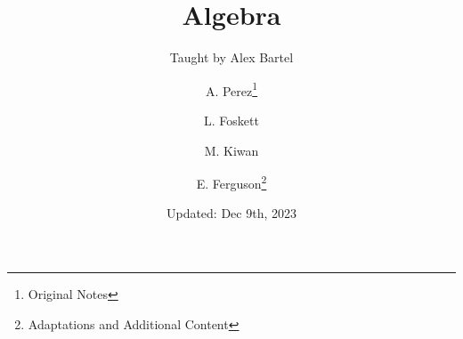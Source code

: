 \documentclass[11pt]{scrartcl}
\title{Algebra}
\subtitle{Taught by Alex Bartel}
\author{A. Perez\thanks{Original Notes} \and L. Foskett \and M. Kiwan \and E. Ferguson\thanks{Adaptations and Additional Content}}
\date{Updated: Dec 9th, 2023}
\begin{document}
 \maketitle
 


\tableofcontents
\newpage
\listoftheorems
\newpage

































\end{document}
